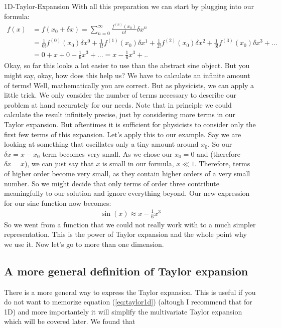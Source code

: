 \begin{examplebox}{1D-Taylor-Expansion}
	With all this preparation we can start by plugging into our formula:
	\begin{align*}
		f(x)&=f(x_0+\delta x)= \sum_{n=0}^\infty \frac{f^{(n)}(x_0)}{n!}\delta x^n\\
		&= \frac{1}{0!}f^{(0)}(x_0)\delta x^0 + \frac{1}{1!} f^{(1)}(x_0)\delta x^1 +  \frac{1}{2!}f^{(2)}(x_0)\delta x^2 + \frac{1}{3!} f^{(3)}(x_0)\delta x^3 + ...\\
		&= 0 + x + 0 - \frac{1}{6} x^3 +... = x- \frac{1}{6} x^3 +..
	\end{align*}
	Okay, so far this looks a lot easier to use than the abstract sine object. But you might say, okay, how does this help us? We have to calculate an infinite amount of terms! Well, mathematically you are correct. But as physicists, we can apply a little trick. We only consider the number of terms necessary to describe our problem at hand accurately for our needs. Note that in principle we could calculate the result infinitely precise, just by considering more terms in our Taylor expansion. But oftentimes it is sufficient for physicists to consider only the first few terms of this expansion. Let's apply this to our example. Say we are looking at something that oscillates only a tiny amount around $x_0$. So our $\delta x = x-x_0$ term becomes very small. As we chose our $x_0=0$ and (therefore $\delta x = x$), we can just say that $x$ is small in our formula, $x \ll 1$. Therefore, terms of higher order become very small, as they contain higher orders of a very small number. So we might decide that only terms of order three contribute meaningfully to our solution and ignore everything beyond. 
	Our new expression for our sine function now becomes:
	\begin{align}
		\sin(x) \approx x- \frac{1}{6} x^3
	\end{align}
	So we went from a function that we could not really work with to a much simpler representation. This is the power of Taylor expansion and the whole point why we use it. 
	Now let's go to more than one dimension.
\end{examplebox}
\subsection{A more general definition of Taylor expansion}
There is a more general way to express the Taylor expansion. This is useful if you do not want to memorize equation (\ref{eq:taylor1d}) (altough I recommend that for 1D) and more importantely it will simplify the multivariate Taylor expansion which will be covered later. We found that 

